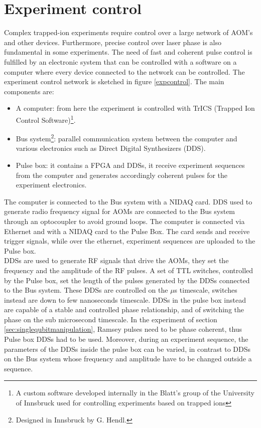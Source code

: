 \section{Experiment control}
Complex trapped-ion experiments require control over a large network of AOM's and other devices. Furthermore, precise control over laser phase is also fundamental in some experiments. The need of fast and coherent pulse control is fulfilled by an electronic system that can be controlled with a software on a computer where every device connected to the network can be controlled. The experiment control network is sketched in figure \ref{expcontrol}. The main components are:
\begin{itemize}
\item A computer: from here the experiment is controlled with TrICS (Trapped Ion Control Software)\footnote{A custom software developed internally in the Blatt's group of the University of Innsbruck used for controlling experiments based on trapped ions}.
\item Bus system\footnote{Designed in Innsbruck by G. Hendl.}: parallel communication system between the computer and various electronics such as Direct Digital Synthesizers (DDS).
\item Pulse box: it contains a FPGA and DDSs, it receive experiment sequences from the computer and generates accordingly coherent pulses for the experiment electronics.
\end{itemize}
The computer is connected to the Bus system with a NIDAQ card. DDS used to generate radio frequency signal for AOMs are connected to the Bus system through an optocoupler to avoid ground loops. The computer is connected via Ethernet and with a NIDAQ card to the Pulse Box. The card sends and receive trigger signals, while over the ethernet, experiment sequences are uploaded to the Pulse box.\\
DDSs are used to generate RF signals that drive the AOMs, they set the frequency and the amplitude of the RF pulses. A set of TTL switches, controlled by the Pulse box, set the length of the pulses generated by the DDSs connected to the Bus system. These DDSs are controlled on the $\mu$s timescale, switches instead are down to few nanoseconds timescale. DDSs in the pulse box instead are capable of a stable and controlled phase relationship, and of switching the phase on the sub microsecond timescale. In the experiment of section \ref{sec:singlequbitmanipulation}, Ramsey pulses need to be phase coherent, thus Pulse box DDSs had to be used. Moreover, during an experiment sequence, the parameters of the DDSs inside the pulse box can be varied, in contrast to DDSs on the Bus system whose frequency and amplitude have to be changed outside a sequence.\\
